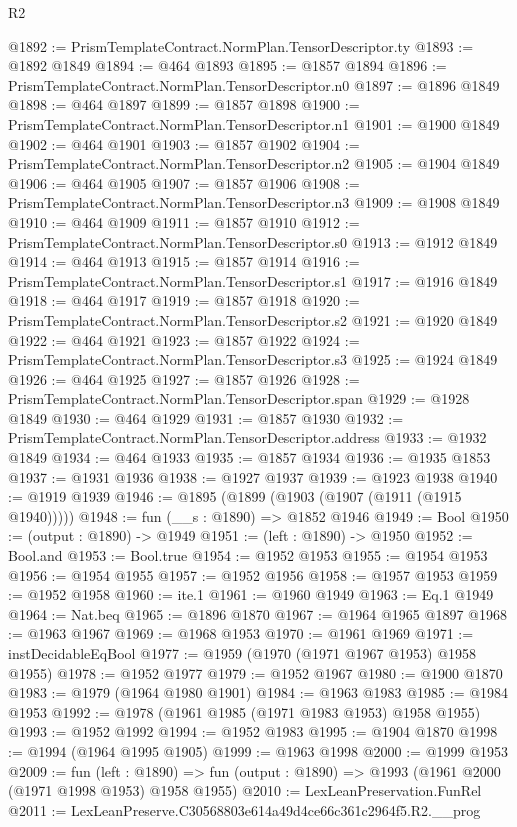 \begin{lexlean}{R2}
\begin{coremodule}
@1892 := PrismTemplateContract.NormPlan.TensorDescriptor.ty
@1893 := @1892 @1849
@1894 := @464 @1893
@1895 := @1857 @1894
@1896 := PrismTemplateContract.NormPlan.TensorDescriptor.n0
@1897 := @1896 @1849
@1898 := @464 @1897
@1899 := @1857 @1898
@1900 := PrismTemplateContract.NormPlan.TensorDescriptor.n1
@1901 := @1900 @1849
@1902 := @464 @1901
@1903 := @1857 @1902
@1904 := PrismTemplateContract.NormPlan.TensorDescriptor.n2
@1905 := @1904 @1849
@1906 := @464 @1905
@1907 := @1857 @1906
@1908 := PrismTemplateContract.NormPlan.TensorDescriptor.n3
@1909 := @1908 @1849
@1910 := @464 @1909
@1911 := @1857 @1910
@1912 := PrismTemplateContract.NormPlan.TensorDescriptor.s0
@1913 := @1912 @1849
@1914 := @464 @1913
@1915 := @1857 @1914
@1916 := PrismTemplateContract.NormPlan.TensorDescriptor.s1
@1917 := @1916 @1849
@1918 := @464 @1917
@1919 := @1857 @1918
@1920 := PrismTemplateContract.NormPlan.TensorDescriptor.s2
@1921 := @1920 @1849
@1922 := @464 @1921
@1923 := @1857 @1922
@1924 := PrismTemplateContract.NormPlan.TensorDescriptor.s3
@1925 := @1924 @1849
@1926 := @464 @1925
@1927 := @1857 @1926
@1928 := PrismTemplateContract.NormPlan.TensorDescriptor.span
@1929 := @1928 @1849
@1930 := @464 @1929
@1931 := @1857 @1930
@1932 := PrismTemplateContract.NormPlan.TensorDescriptor.address
@1933 := @1932 @1849
@1934 := @464 @1933
@1935 := @1857 @1934
@1936 := @1935 @1853
@1937 := @1931 @1936
@1938 := @1927 @1937
@1939 := @1923 @1938
@1940 := @1919 @1939
@1946 := @1895 (@1899 (@1903 (@1907 (@1911 (@1915 @1940)))))
@1948 := fun (__s : @1890) => @1852 @1946
@1949 := Bool
@1950 := (output : @1890) -> @1949
@1951 := (left : @1890) -> @1950
@1952 := Bool.and
@1953 := Bool.true
@1954 := @1952 @1953
@1955 := @1954 @1953
@1956 := @1954 @1955
@1957 := @1952 @1956
@1958 := @1957 @1953
@1959 := @1952 @1958
@1960 := ite.{1}
@1961 := @1960 @1949
@1963 := Eq.{1} @1949
@1964 := Nat.beq
@1965 := @1896 @1870
@1967 := @1964 @1965 @1897
@1968 := @1963 @1967
@1969 := @1968 @1953
@1970 := @1961 @1969
@1971 := instDecidableEqBool
@1977 := @1959 (@1970 (@1971 @1967 @1953) @1958 @1955)
@1978 := @1952 @1977
@1979 := @1952 @1967
@1980 := @1900 @1870
@1983 := @1979 (@1964 @1980 @1901)
@1984 := @1963 @1983
@1985 := @1984 @1953
@1992 := @1978 (@1961 @1985 (@1971 @1983 @1953) @1958 @1955)
@1993 := @1952 @1992
@1994 := @1952 @1983
@1995 := @1904 @1870
@1998 := @1994 (@1964 @1995 @1905)
@1999 := @1963 @1998
@2000 := @1999 @1953
@2009 := fun (left : @1890) =>
  fun (output : @1890) => @1993 (@1961 @2000 (@1971 @1998 @1953) @1958 @1955)
@2010 := LexLeanPreservation.FunRel
@2011 := LexLeanPreserve.C30568803e614a49d4ce66c361c2964f5.R2.__prog

\end{coremodule}
\end{lexlean}
